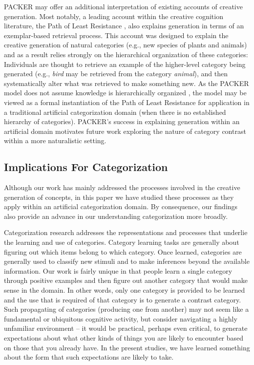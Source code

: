 \documentclass[12pt]{article}
\begin{document}
\begin{flushleft}
PACKER may offer an additional interpretation of existing accounts of creative
generation. Most notably, a leading account within the creative cognition
literature, the Path of Least Resistance \citep{ward1994structured,ward1995s},
also explains generation in terms of an exemplar-based retrieval process. This
account was designed to explain the creative generation of natural categories
(e.g., new species of plants and animals) and as a result relies strongly on the
hierarchical organization of these categories: Individuals are thought to
retrieve an example of the higher-level category being generated (e.g.,
\textit{bird} may be retrieved from the category \textit{animal}), and then
systematically alter what was retrieved to make something new. As the PACKER
model does not assume knowledge is hierarchically organized \citep[this is true
of the exemplar view more broadly, see][]{murphy2016exemplar}, the model may be
viewed as a formal instantiation of the Path of Least Resistance for application
in a traditional artificial categorization domain (when there is no established
hierarchy of categories). PACKER's success in explaining generation within an
artificial domain motivates future work exploring the nature of category
contrast within a more naturalistic setting.

\subsection{Implications For Categorization}

Although our work has mainly addressed the processes involved in the creative
generation of concepts, in this paper we have studied these processes as they
apply within an artificial categorization domain. By consequence, our findings
also provide an advance in our understanding categorization more broadly.

Categorization research addresses the representations and processes that
underlie the learning and use of categories. Category learning tasks are
generally about figuring out which items belong to which category. Once learned,
categories are generally used to classify new stimuli and to make inferences
beyond the available information. Our work is fairly unique in that people learn
a single category through positive examples and then figure out another category
that would make sense in the domain. In other words, only one category is
provided to be learned and the use that is required of that category is to
generate a contrast category. Such propagating of categories (producing one from
another) may not seem like a fundamental or ubiquitous cognitive activity, but
consider navigating a highly unfamiliar environment -- it would be practical,
perhaps even critical, to generate expectations about what other kinds of things
you are likely to encounter based on those that you already have. In the present
studies, we have learned something about the form that such expectations are
likely to take.


\end{flushleft}
\end{document}
